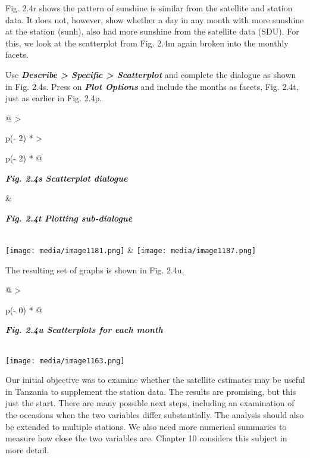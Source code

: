 \documentclass[
  letterpaper,
  DIV=11,
  numbers=noendperiod]{scrreprt}
\begin{document}
Fig. 2.4r shows the pattern of sunshine is similar from the satellite
and station data. It does not, however, show whether a day in any month
with more sunshine at the station (sunh), also had more sunshine from
the satellite data (SDU). For this, we look at the scatterplot from Fig.
2.4m again broken into the monthly facets.

Use \textbf{\emph{Describe \textgreater{} Specific \textgreater{}
Scatterplot}} and complete the dialogue as shown in Fig. 2.4s. Press on
\textbf{\emph{Plot Options}} and include the months as facets, Fig.
2.4t, just as earlier in Fig. 2.4p.

\begin{longtable}[]{@{}
  >{\raggedright\arraybackslash}p{(\columnwidth - 2\tabcolsep) * }
  >{\raggedright\arraybackslash}p{(\columnwidth - 2\tabcolsep) * }@{}}
\toprule\noalign{}
\begin{minipage}[b]{\linewidth}\raggedright
\textbf{\emph{Fig. 2.4s Scatterplot dialogue}}
\end{minipage} & \begin{minipage}[b]{\linewidth}\raggedright
\textbf{\emph{Fig. 2.4t Plotting sub-dialogue}}
\end{minipage} \\
\midrule\noalign{}
\endhead
\bottomrule\noalign{}
\endlastfoot
\texttt{[image: media/image1181.png]} &
\texttt{[image: media/image1187.png]} \\
\end{longtable}

The resulting set of graphs is shown in Fig. 2.4u.

\begin{longtable}[]{@{}
  >{\raggedright\arraybackslash}p{(\columnwidth - 0\tabcolsep) * }@{}}
\toprule\noalign{}
\begin{minipage}[b]{\linewidth}\raggedright
\textbf{\emph{Fig. 2.4u Scatterplots for each month}}
\end{minipage} \\
\midrule\noalign{}
\endhead
\bottomrule\noalign{}
\endlastfoot
\texttt{[image: media/image1163.png]} \\
\end{longtable}

Our initial objective was to examine whether the satellite estimates may
be useful in Tanzania to supplement the station data. The results are
promising, but this just the start. There are many possible next steps,
including an examination of the occasions when the two variables differ
substantially. The analysis should also be extended to multiple
stations. We also need more numerical summaries to measure how close the
two variables are. Chapter 10 considers this subject in more detail.
\end{document}
